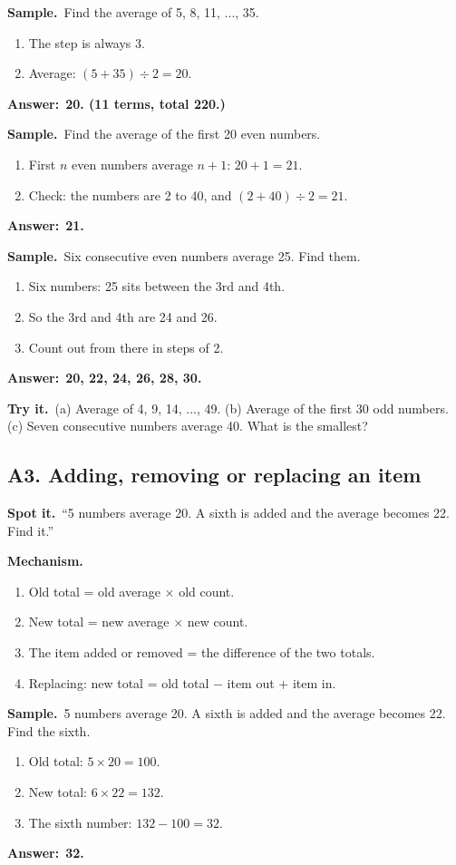 \documentclass[11pt,a4paper]{article}
\let\oldsubsection\subsection
\renewcommand{\subsection}{\needspace{9\baselineskip}\oldsubsection}
\newcommand{\spot}{\textbf{\color{ember}Spot it.}\ }
\newcommand{\mech}{\textbf{\color{ember}Mechanism.}\ }
\newif\ifkeepsamp
\newcommand{\ans}[1]{\par\nopagebreak\noindent\textbf{\color{ember}Answer:}\ \textbf{#1}\par}
\newcommand{\samp}{\ifkeepsamp\needspace{4\baselineskip}\fi\textbf{\color{ember}Sample.}\ }
\newcommand{\tryit}[1]{\textbf{\color{ember}Try it.}\ #1}
\begin{document}
\samp Find the average of 5, 8, 11, ..., 35.
\begin{enumerate}
\item The step is always 3.
\item Average: $(5 + 35) \div 2 = 20$.
\end{enumerate}
\ans{20. (11 terms, total 220.)}

\samp Find the average of the first 20 even numbers.
\begin{enumerate}
\item First $n$ even numbers average $n + 1$: $20 + 1 = 21$.
\item Check: the numbers are 2 to 40, and $(2 + 40) \div 2 = 21$.
\end{enumerate}
\ans{21.}

\samp Six consecutive even numbers average 25. Find them.
\begin{enumerate}
\item Six numbers: 25 sits between the 3rd and 4th.
\item So the 3rd and 4th are 24 and 26.
\item Count out from there in steps of 2.
\end{enumerate}
\ans{20, 22, 24, 26, 28, 30.}

\tryit (a) Average of 4, 9, 14, ..., 49. (b) Average of the first 30 odd numbers. (c) Seven consecutive numbers average 40. What is the smallest?

\subsection{A3. Adding, removing or replacing an item}
\spot ``5 numbers average 20. A sixth is added and the average becomes 22. Find it.''

\mech
\begin{enumerate}
\item Old total = old average $\times$ old count.
\item New total = new average $\times$ new count.
\item The item added or removed = the difference of the two totals.
\item Replacing: new total = old total $-$ item out + item in.
\end{enumerate}

\samp 5 numbers average 20. A sixth is added and the average becomes 22. Find the sixth.
\begin{enumerate}
\item Old total: $5 \times 20 = 100$.
\item New total: $6 \times 22 = 132$.
\item The sixth number: $132 - 100 = 32$.
\end{enumerate}
\ans{32.}
\end{document}

